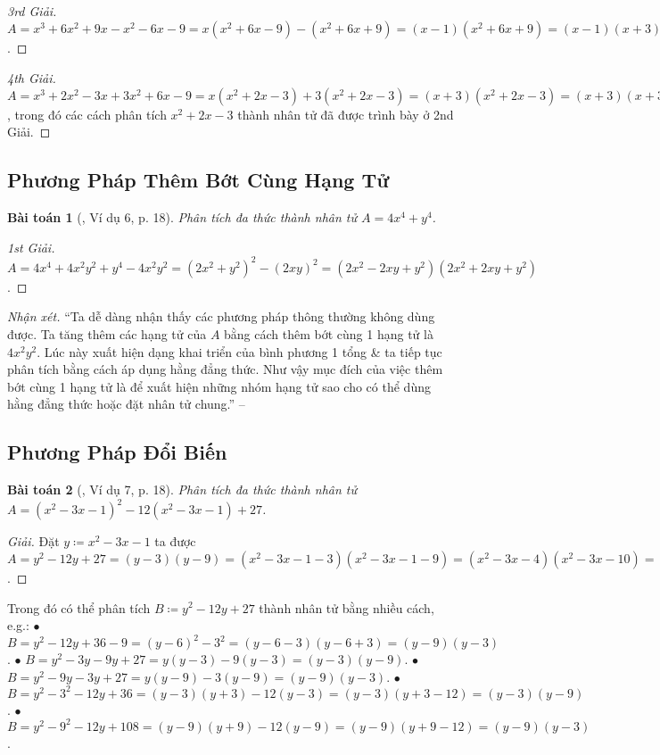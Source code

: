 \documentclass{article}
\numberwithin{equation}{section}
\newtheorem{baitoan}{Bài toán}
\begin{document}
\begin{proof}[3rd Giải]
	$A = x^3 + 6x^2 + 9x - x^2 - 6x - 9 = x(x^2 + 6x - 9) - (x^2 + 6x + 9) = (x - 1)(x^2 + 6x + 9) = (x - 1)(x + 3)^2$.
\end{proof}

\begin{proof}[4th Giải]
	$A = x^3 + 2x^2 - 3x + 3x^2 + 6x - 9 = x(x^2 + 2x - 3) + 3(x^2 + 2x - 3) = (x + 3)(x^2 + 2x - 3) = (x + 3)(x + 3)(x - 1) = (x + 3)^2(x - 1)$, trong đó các cách phân tích $x^2 + 2x - 3$ thành nhân tử đã được trình bày ở 2nd Giải.
\end{proof}

\subsection{Phương Pháp Thêm Bớt Cùng Hạng Tử}

\begin{baitoan}[\cite{Tuyen_Toan_8}, Ví dụ 6, p. 18]
	Phân tích đa thức thành nhân tử $A = 4x^4 + y^4$.
\end{baitoan}

\begin{proof}[1st Giải]
	$A = 4x^4 + 4x^2y^2 + y^4 - 4x^2y^2 = (2x^2 + y^2)^2 - (2xy)^2 = (2x^2 - 2xy + y^2 )(2x^2 + 2xy + y^2)$.
\end{proof}
\noindent\textit{Nhận xét.} ``Ta dễ dàng nhận thấy các phương pháp thông thường không dùng được. Ta tăng thêm các hạng tử của $A$ bằng cách thêm bớt cùng 1 hạng tử là $4x^2y^2$. Lúc này xuất hiện dạng khai triển của bình phương 1 tổng \& ta tiếp tục phân tích bằng cách áp dụng hằng đẳng thức. Như vậy mục đích của việc thêm bớt cùng 1 hạng tử là để xuất hiện những nhóm hạng tử sao cho có thể dùng hằng đẳng thức hoặc đặt nhân tử chung.'' -- \cite[p. 18]{Tuyen_Toan_8}

\subsection{Phương Pháp Đổi Biến}

\begin{baitoan}[\cite{Tuyen_Toan_8}, Ví dụ 7, p. 18]
	Phân tích đa thức thành nhân tử $A = (x^2 - 3x - 1)^2 - 12(x^2 - 3x - 1) + 27$.
\end{baitoan}

\begin{proof}[Giải]
	Đặt $y\coloneqq x^2 - 3x - 1$ ta được $A = y^2 - 12y + 27 = (y - 3)(y - 9) = (x^2 - 3x - 1 - 3)(x^2 - 3x - 1 - 9) = (x^2 - 3x - 4)(x^2 - 3x - 10) = (x + 1)(x - 4)(x + 2)(x - 5)$.
\end{proof}
Trong đó có thể phân tích $B\coloneqq y^2 - 12y + 27$ thành nhân tử bằng nhiều cách, e.g.: $\bullet$ $B = y^2 - 12y + 36 - 9 = (y - 6)^2 - 3^2 = (y - 6 - 3)(y - 6 + 3) = (y - 9)(y - 3)$. $\bullet$ $B = y^2 - 3y - 9y + 27 = y(y - 3) - 9(y - 3) = (y - 3)(y - 9)$. $\bullet$ $B = y^2 - 9y - 3y + 27 = y(y - 9) - 3(y - 9) = (y - 9)(y - 3)$. $\bullet$ $B = y^2 - 3^2 - 12y + 36 = (y - 3)(y + 3) - 12(y - 3) = (y - 3)(y + 3 - 12) = (y - 3)(y - 9)$. $\bullet$ $B = y^2 - 9^2 - 12y + 108 = (y - 9)(y + 9) - 12(y - 9) = (y - 9)(y + 9 - 12) = (y - 9)(y - 3)$.
\end{document}
